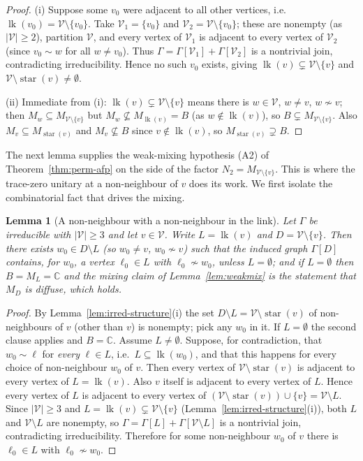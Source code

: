 \documentclass[11pt]{article}
\newtheorem{lemma}{Lemma}
\DeclareMathOperator{\link}{lk}
\DeclareMathOperator{\str}{star}
\newcommand{\Gra}{\Gamma}
\newcommand{\VV}{\mathcal V}
\newcommand{\abs}[1]{\lvert #1\rvert}
\newcommand{\set}[1]{\{#1\}}
\begin{document}
\begin{proof}
(i) Suppose some $v_0$ were adjacent to all other vertices, i.e.\ $\link(v_0)=\VV\setminus\set{v_0}$. Take
$\VV_1=\set{v_0}$ and $\VV_2=\VV\setminus\set{v_0}$; these are nonempty (as $\abs\VV\ge2$), partition $\VV$,
and every vertex of $\VV_1$ is adjacent to every vertex of $\VV_2$ (since $v_0\sim w$ for all
$w\ne v_0$). Thus $\Gra=\Gra[\VV_1]+\Gra[\VV_2]$ is a nontrivial join, contradicting irreducibility. Hence no
such $v_0$ exists, giving $\link(v)\subsetneq\VV\setminus\set v$ and $\VV\setminus\str(v)\ne\emptyset$.

(ii) Immediate from (i): $\link(v)\subsetneq\VV\setminus\set v$ means there is $w\in\VV$, $w\ne v$,
$w\not\sim v$; then $M_w\subseteq M_{\VV\setminus\set v}$ but $M_w\not\subseteq M_{\link(v)}=B$ (as
$w\notin\link(v)$), so $B\subsetneq M_{\VV\setminus\set v}$. Also $M_v\subseteq M_{\str(v)}$ and
$M_v\not\subseteq B$ since $v\notin\link(v)$, so $M_{\str(v)}\supsetneq B$.
\end{proof}

The next lemma supplies the weak-mixing hypothesis (A2) of Theorem~\ref{thm:perm-afp} on the side of the
factor $N_2=M_{\VV\setminus\set v}$. This is where the trace-zero unitary at a non-neighbour of $v$ does its
work. We first isolate the combinatorial fact that drives the mixing.

\begin{lemma}[A non-neighbour with a non-neighbour in the link]\label{lem:combo-mix}
Let $\Gra$ be irreducible with $\abs{\VV}\ge3$ and let $v\in\VV$. Write $L=\link(v)$ and
$D=\VV\setminus\set v$. Then there exists $w_0\in D\setminus L$ (so $w_0\ne v$, $w_0\not\sim v$) such that the
induced graph $\Gra[D]$ contains, for $w_0$, a vertex $\ell_0\in L$ with $\ell_0\not\sim w_0$, \emph{unless}
$L=\emptyset$; and if $L=\emptyset$ then $B=M_L=\mathbb C$ and the mixing claim of
Lemma~\ref{lem:weakmix} is the statement that $M_D$ is diffuse, which holds.
\end{lemma}

\begin{proof}
By Lemma~\ref{lem:irred-structure}(i) the set $D\setminus L=\VV\setminus\str(v)$ of non-neighbours of $v$
(other than $v$) is nonempty; pick any $w_0$ in it. If $L=\emptyset$ the second clause applies and
$B=\mathbb C$. Assume $L\ne\emptyset$. Suppose, for contradiction, that $w_0\sim\ell$ for \emph{every}
$\ell\in L$, i.e.\ $L\subseteq\link(w_0)$, and that this happens for every choice of non-neighbour $w_0$ of
$v$. Then every vertex of $\VV\setminus\str(v)$ is adjacent to every vertex of $L=\link(v)$. Also $v$ itself
is adjacent to every vertex of $L$. Hence every vertex of $L$ is adjacent to every vertex of
$(\VV\setminus\str(v))\cup\set v=\VV\setminus L$. Since $\abs{\VV}\ge3$ and $L=\link(v)\subsetneq\VV\setminus\set v$
(Lemma~\ref{lem:irred-structure}(i)), both $L$ and $\VV\setminus L$ are nonempty, so
$\Gra=\Gra[L]+\Gra[\VV\setminus L]$ is a nontrivial join, contradicting irreducibility. Therefore for some
non-neighbour $w_0$ of $v$ there is $\ell_0\in L$ with $\ell_0\not\sim w_0$.
\end{proof}
\end{document}

